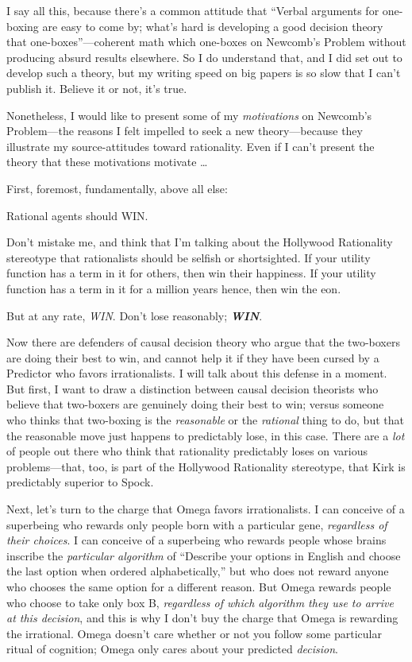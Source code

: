 {
 I say all this, because there's a common attitude
that ``Verbal arguments for one-boxing are easy to
come by; what's hard is developing a good decision
theory that one-boxes''---coherent math which
one-boxes on Newcomb's Problem without producing absurd
results elsewhere. So I do understand that, and I did set out to
develop such a theory, but my writing speed on big papers is so slow
that I can't publish it. Believe it or not,
it's true.}

{
 Nonetheless, I would like to present some of my
\textit{motivations} on Newcomb's Problem---the reasons
I felt impelled to seek a new theory---because they illustrate my
source-attitudes toward rationality. Even if I can't
present the theory that these motivations motivate \ldots}

{
 First, foremost, fundamentally, above all else:}

{
 Rational agents should WIN.}

{
 Don't mistake me, and think that
I'm talking about the Hollywood Rationality stereotype
that rationalists should be selfish or shortsighted. If your utility
function has a term in it for others, then win their happiness. If your
utility function has a term in it for a million years hence, then win
the eon.}

{
 But at any rate, \textit{WIN}. Don't lose
reasonably; \textbf{\textit{WIN}}.}

{
 Now there are defenders of causal decision theory who argue that
the two-boxers are doing their best to win, and cannot help it if they
have been cursed by a Predictor who favors irrationalists. I will talk
about this defense in a moment. But first, I want to draw a distinction
between causal decision theorists who believe that two-boxers are
genuinely doing their best to win; versus someone who thinks that
two-boxing is the \textit{reasonable} or the \textit{rational} thing to
do, but that the reasonable move just happens to predictably lose, in
this case. There are a \textit{lot} of people out there who think that
rationality predictably loses on various problems---that, too, is part
of the Hollywood Rationality stereotype, that Kirk is predictably
superior to Spock.}

{
 Next, let's turn to the charge that Omega favors
irrationalists. I can conceive of a superbeing who rewards only people
born with a particular gene, \textit{regardless of their choices}. I
can conceive of a superbeing who rewards people whose brains inscribe
the \textit{particular algorithm} of ``Describe your
options in English and choose the last option when ordered
alphabetically,'' but who does not reward anyone who
chooses the same option for a different reason. But Omega rewards
people who choose to take only box B, \textit{regardless of which
algorithm they use to arrive at this decision}, and this is why I
don't buy the charge that Omega is rewarding the
irrational. Omega doesn't care whether or not you
follow some particular ritual of cognition; Omega only cares about your
predicted \textit{decision}.}


